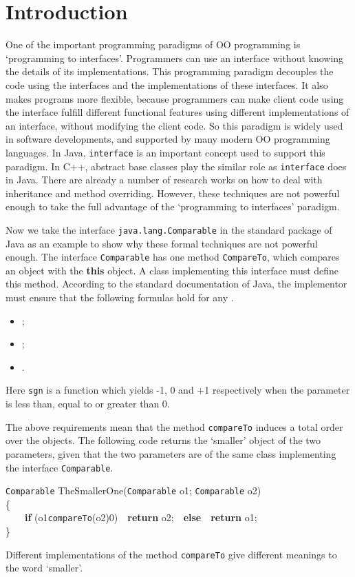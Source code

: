 \documentclass[fleqn]{llncs}
\begin{document}
\section{Introduction}
One of the important programming paradigms of OO programming is `programming to interfaces'.
Programmers can use an interface without knowing the details of its implementations.
This programming paradigm decouples the code using the interfaces and the implementations of these
interfaces. It also makes programs more flexible, because programmers can make client code using the interface fulfill different functional
features using different implementations of an interface, without modifying the client code.
So this paradigm is widely used in software developments, and supported by many modern
OO programming languages. In Java, \texttt{interface} is an important concept used to support this paradigm.
In C++, abstract base classes play the similar role as \texttt{interface} does in Java.
There are already a number of research works on how to deal with inheritance and method overriding.
However, these techniques are not powerful enough to take the full advantage of the `programming to interfaces' paradigm.

Now we take the interface \texttt{java.lang.Comparable} in the standard package of Java as an example to show
why these formal techniques are not powerful enough. The interface \texttt{Comparable}
has one method \texttt{CompareTo}, which compares an object with the \textbf{this} object.
A class implementing this interface must define this method. According to the standard documentation of Java, the implementor must ensure that the following
formulas hold for any .
\begin{itemize}
\item  ;
\item  ;
\item  .
\end{itemize}
Here \texttt{sgn} is a function which yields -1, 0 and +1 respectively when the parameter is less than, equal to or greater than 0.

The above requirements mean that the method \texttt{compareTo} induces a total order over the objects. The following
code returns the `smaller' object of the two parameters, given that the two parameters are of the same class implementing the interface \texttt{Comparable}.
\begin{center}
\begin{minipage}{0.6\textwidth}
\scriptsize
\texttt{Comparable} TheSmallerOne(\texttt{Comparable} o1; \texttt{Comparable} o2)\\
\{\\
\mbox{}\ \ \ \ \textbf{if} (o1\fldacc\texttt{compareTo}(o2)0)\ \ \textbf{return} o2;\ \ \textbf{else}\ \ \textbf{return} o1;\ \ \\
\}
\end{minipage}
\end{center}
Different implementations of the method \texttt{compareTo} give different meanings to the word `smaller'.
\end{document}
